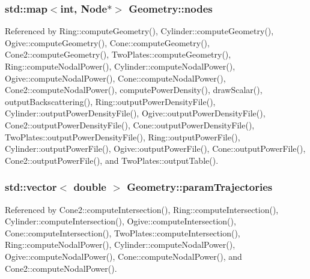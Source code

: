 \hypertarget{classGeometry_a9f5642ca54e0353b871d733e25ccc56e}{
\subsubsection[{nodes}]{\setlength{\rightskip}{0pt plus 5cm}std\-::map$<$int, {\bf Node}$\ast$$>$ Geometry\-::nodes\hspace{0.3cm}{\ttfamily [protected]}}}\label{classGeometry_a9f5642ca54e0353b871d733e25ccc56e}


Referenced by Ring\-::compute\-Geometry(), Cylinder\-::compute\-Geometry(), Ogive\-::compute\-Geometry(), Cone\-::compute\-Geometry(), Cone2\-::compute\-Geometry(), Two\-Plates\-::compute\-Geometry(), Ring\-::compute\-Nodal\-Power(), Cylinder\-::compute\-Nodal\-Power(), Ogive\-::compute\-Nodal\-Power(), Cone\-::compute\-Nodal\-Power(), Cone2\-::compute\-Nodal\-Power(), compute\-Power\-Density(), draw\-Scalar(), output\-Backscattering(), Ring\-::output\-Power\-Density\-File(), Cylinder\-::output\-Power\-Density\-File(), Ogive\-::output\-Power\-Density\-File(), Cone2\-::output\-Power\-Density\-File(), Cone\-::output\-Power\-Density\-File(), Two\-Plates\-::output\-Power\-Density\-File(), Ring\-::output\-Power\-File(), Cylinder\-::output\-Power\-File(), Ogive\-::output\-Power\-File(), Cone\-::output\-Power\-File(), Cone2\-::output\-Power\-File(), and Two\-Plates\-::output\-Table().

\hypertarget{classGeometry_a90ddae3ca87d3c358e2f63611c244be7}{
\subsubsection[{param\-Trajectories}]{\setlength{\rightskip}{0pt plus 5cm}std\-::vector$<$ double $>$ Geometry\-::param\-Trajectories\hspace{0.3cm}{\ttfamily [protected]}}}\label{classGeometry_a90ddae3ca87d3c358e2f63611c244be7}


Referenced by Cone2\-::compute\-Intersection(), Ring\-::compute\-Intersection(), Cylinder\-::compute\-Intersection(), Ogive\-::compute\-Intersection(), Cone\-::compute\-Intersection(), Two\-Plates\-::compute\-Intersection(), Ring\-::compute\-Nodal\-Power(), Cylinder\-::compute\-Nodal\-Power(), Ogive\-::compute\-Nodal\-Power(), Cone\-::compute\-Nodal\-Power(), and Cone2\-::compute\-Nodal\-Power().

